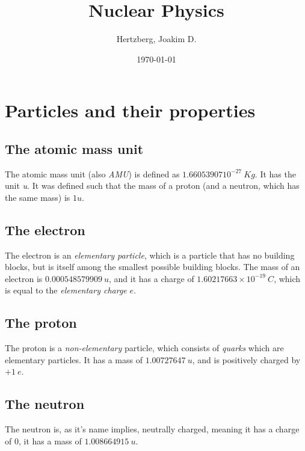 \documentclass[12pt]{article}
\title{Nuclear Physics}
\author{Hertzberg, Joakim D.}
\date{\today}
\begin{document}

\begin{titlepage}
\maketitle
\begin{center}
\thispagestyle{empty}
\end{center}
\end{titlepage}

\tableofcontents

\newpage


\section{Particles and their properties}
\subsection{The atomic mass unit}

The atomic mass unit (also \emph{AMU}) is defined as $1.66053907 10^{-27} \ Kg$. It has the unit \emph{u}.
It was defined such that the mass of a proton (and a neutron, which has the same mass) is $1u$.

\subsection{The electron}

The electron is an \emph{elementary particle}, which is a particle that has no building blocks, but is itself among the smallest possible building blocks.
The mass of an electron is $0.000548579909 \ u$, and it has a charge of $1.60217663 \times 10^{-19} \ C$, which is equal to the \emph{elementary charge} $e$.

\subsection{The proton}
The proton is a \emph{non-elementary} particle, which consists of \emph{quarks} which are elementary particles. It has a mass of $1.00727647 \ u$, and is positively charged by $+1 \ e$.

\subsection{The neutron}
The neutron is, as it's name implies, neutrally charged, meaning it has a charge of $0$, it has a mass of $1.008664915 \ u$.
\end{document}

